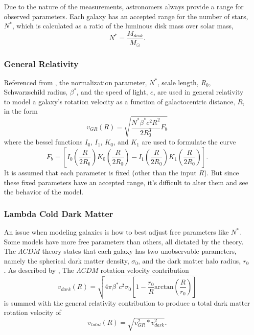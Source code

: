 \documentclass[conference]{IEEEtran}
\begin{document}
Due to the nature of the measurements, astronomers always provide a range for observed parameters. Each galaxy has an accepted range for the number of stars, $N^*$, which is calculated as a ratio of the luminous disk mass over solar mass,
\begin{equation}
N^* = \frac{M_{disk}}{M_{\odot}}.
\end{equation}

\subsubsection{General Relativity}

Referenced from \cite{mannheim}, the normalization parameter, $N^*$, scale length, $R_0$, Schwarzschild radius, $\beta^*$, and the speed of light, $c$, are used in general relativity to model a galaxy's rotation velocity as a function of galactocentric distance, $R$, in the form
\begin{equation}
v_{GR}(R) = \sqrt{\frac{N^*\beta^*c^2R^2}{2R^3_0}F_b}
\end{equation}
where the bessel functions $I_0$, $I_1$, $K_0$, and $K_1$ are used to formulate the curve
\begin{equation}
F_b = \left[I_0\left(\frac{R}{2R_0}\right)K_0\left(\frac{R}{2R_0}\right)-I_1\left(\frac{R}{2R_0}\right)K_1\left(\frac{R}{2R_0}\right)\right].
\end{equation}
It is assumed that each parameter is fixed (other than the input $R$). But since these fixed parameters have an accepted range, it's difficult to alter them and see the behavior of the model. 


\subsubsection{Lambda Cold Dark Matter}
An issue when modeling galaxies is how to best adjust free parameters like $N^*$. Some models have more free parameters than others, all dictated by the theory. The $\Lambda CDM$ theory states that each galaxy has two unobservable parameters, namely the spherical dark matter density, $\sigma_0$, and the dark matter halo radius, $r_0$. As described by \cite{mannheim}, The $\Lambda CDM$ rotation velocity contribution
\begin{equation}
v_{dark}(R) = \sqrt{4\pi\beta^*c^2\sigma_0\left[1-\frac{r_0}{R}\text{arctan}\left(\frac{R}{r_0}\right)\right]}
\end{equation}
is summed with the general relativity contribution to produce a total dark matter rotation velocity of 
\begin{equation}
v_{total}(R) = \sqrt{v_{GR}^2 * v_{dark}^2}.
\end{equation}
\end{document}
